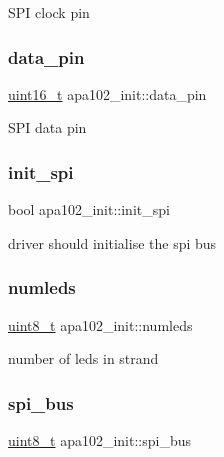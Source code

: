 S\+PI clock pin \mbox{\label{structapa102__init_aa938ca9d53d2a52df51cda832fea8db4}} 
\subsubsection{\texorpdfstring{data\+\_\+pin}{data\_pin}}
{\footnotesize\ttfamily \hyperlink{vl53l0x__types_8h_a273cf69d639a59973b6019625df33e30}{uint16\+\_\+t} apa102\+\_\+init\+::data\+\_\+pin}

S\+PI data pin \mbox{\label{structapa102__init_ad361c33a36cb76c75374cf510b44bb49}} 
\subsubsection{\texorpdfstring{init\+\_\+spi}{init\_spi}}
{\footnotesize\ttfamily bool apa102\+\_\+init\+::init\+\_\+spi}

driver should initialise the spi bus \mbox{\label{structapa102__init_a223a3c25189d56bf4defec98f1f0bba6}} 
\subsubsection{\texorpdfstring{numleds}{numleds}}
{\footnotesize\ttfamily \hyperlink{vl53l0x__types_8h_aba7bc1797add20fe3efdf37ced1182c5}{uint8\+\_\+t} apa102\+\_\+init\+::numleds}

number of leds in strand \mbox{\label{structapa102__init_acce9148e955ab737c1caf45e755ed4ac}} 
\subsubsection{\texorpdfstring{spi\+\_\+bus}{spi\_bus}}
{\footnotesize\ttfamily \hyperlink{vl53l0x__types_8h_aba7bc1797add20fe3efdf37ced1182c5}{uint8\+\_\+t} apa102\+\_\+init\+::spi\+\_\+bus}


